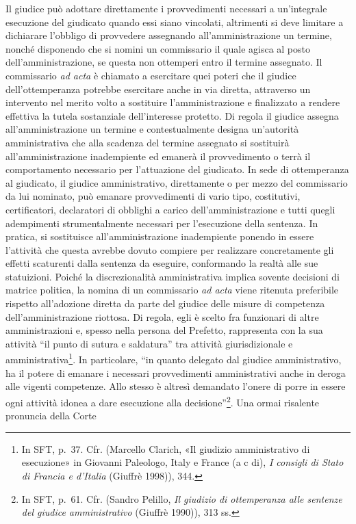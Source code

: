 \documentclass[12pt,it,a4paper,]{report}
\begin{document}
Il giudice può adottare direttamente i provvedimenti necessari a
un'integrale esecuzione del giudicato quando essi siano vincolati,
altrimenti si deve limitare a dichiarare l'obbligo di provvedere
assegnando all'amministrazione un termine, nonché disponendo che si
nomini un commissario il quale agisca al posto dell'amministrazione, se
questa non ottemperi entro il termine assegnato. Il commissario \emph{ad
acta} è chiamato a esercitare quei poteri che il giudice
dell'ottemperanza potrebbe esercitare anche in via diretta, attraverso
un intervento nel merito volto a sostituire l'amministrazione e
finalizzato a rendere effettiva la tutela sostanziale dell'interesse
protetto. Di regola il giudice assegna all'amministrazione un termine e
contestualmente designa un'autorità amministrativa che alla scadenza del
termine assegnato si sostituirà all'amministrazione inadempiente ed
emanerà il provvedimento o terrà il comportamento necessario per
l'attuazione del giudicato. In sede di ottemperanza al giudicato, il
giudice amministrativo, direttamente o per mezzo del commissario da lui
nominato, può emanare provvedimenti di vario tipo, costitutivi,
certificatori, declaratori di obblighi a carico dell'amministrazione e
tutti quegli adempimenti strumentalmente necessari per l'esecuzione
della sentenza. In pratica, si sostituisce all'amministrazione
inadempiente ponendo in essere l'attività che questa avrebbe dovuto
compiere per realizzare concretamente gli effetti scaturenti dalla
sentenza da eseguire, conformando la realtà alle sue statuizioni. Poiché
la discrezionalità amministrativa implica sovente decisioni di matrice
politica, la nomina di un commissario \emph{ad acta} viene ritenuta
preferibile rispetto all'adozione diretta da parte del giudice delle
misure di competenza dell'amministrazione riottosa. Di regola, egli è
scelto fra funzionari di altre amministrazioni e, spesso nella persona
del Prefetto, rappresenta con la sua attività ``il punto di sutura e
saldatura'' tra attività giurisdizionale e amministrativa\footnote{In
  SFT, p.~37. Cfr. (Marcello Clarich, {«Il giudizio amministrativo di
  esecuzione»} in Giovanni Paleologo, Italy e France (a c di), \emph{I
  consigli di Stato di Francia e d'Italia} (Giuffrè 1998)), 344.}. In
particolare, ``in quanto delegato dal giudice amministrativo, ha il
potere di emanare i necessari provvedimenti amministrativi anche in
deroga alle vigenti competenze. Allo stesso è altresì demandato l'onere
di porre in essere ogni attività idonea a dare esecuzione alla
decisione''\footnote{In SFT, p.~61. Cfr. (Sandro Pelillo, \emph{Il
  giudizio di ottemperanza alle sentenze del giudice amministrativo}
  (Giuffrè 1990)), 313 ss.}. Una ormai risalente pronuncia della Corte
\end{document}
